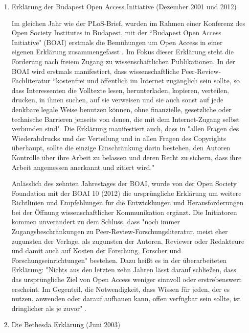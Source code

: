 \begin{enumerate}
\item Erklärung der Budapest Open Access Initiative (Dezember 2001 und 2012)

Im gleichen Jahr wie der PLoS-Brief, wurden im Rahmen einer Konferenz des Open Society Institutes in Budapest, mit der “Budapest Open Access Initiative" (BOAI)\cite{boai_2012} erstmals die Bemühungen um Open Access in einer eigenen Erklärung zusammengefasst \cite{cite:21a}. Im Fokus dieser Erklärung steht die Forderung nach freiem Zugang zu wissenschaftlichen Publikationen. In der BOAI wird erstmals manifestiert, dass wissenschaftliche Peer-Review-Fachliteratur “kostenfrei und öffentlich im Internet zugänglich sein sollte, so dass Interessenten die Volltexte lesen, herunterladen, kopieren, verteilen, drucken, in ihnen suchen, auf sie verweisen und sie auch sonst auf jede denkbare legale Weise benutzen können, ohne finanzielle, gesetzliche oder technische Barrieren jenseits von denen, die mit dem Internet-Zugang selbst verbunden sind". \cite{boai_2012} Die Erklärung manifestiert auch, dass in "allen Fragen des Wiederabdrucks und der Verteilung und in allen Fragen des Copyrights überhaupt, sollte die einzige Einschränkung darin bestehen, den Autoren Kontrolle über ihre Arbeit zu belassen und deren Recht zu sichern, dass ihre Arbeit angemessen anerkannt und zitiert wird." \cite{boai_2012}

Anlässlich des zehnten Jahrestages der BOAI, wurde von der Open Society Foundation mit der BOAI 10 (2012) die ursprüngliche Erklärung um weitere Richtlinien und Empfehlungen für die Entwicklungen und Herausforderungen bei der Öffnung wissenschaftlicher Kommunikation ergänzt. Die Initiatoren kommen unverändert zu dem Schluss, dass "noch immer Zugangsbeschränkungen zu Peer-Review-Forschungsliteratur, meist eher zugunsten der Verlage, als zugunsten der Autoren, Reviewer oder Redakteure und damit auch auf Kosten der Forschung, Forscher und Forschungseinrichtungen" \cite{boai_2012} bestehen. Dazu heißt es in der überarbeiteten Erklärung: "Nichts aus den letzten zehn Jahren lässt darauf schließen, dass das ursprüngliche Ziel von Open Access weniger sinnvoll oder erstrebenswert erscheint. Im Gegenteil, die Notwendigkeit, dass Wissen für jeden, der es nutzen, anwenden oder darauf aufbauen kann, offen verfügbar sein sollte, ist dringlicher als je zuvor" \cite{boai_2012}.

\item Die Bethesda Erklärung (Juni 2003)


\end{enumerate}
